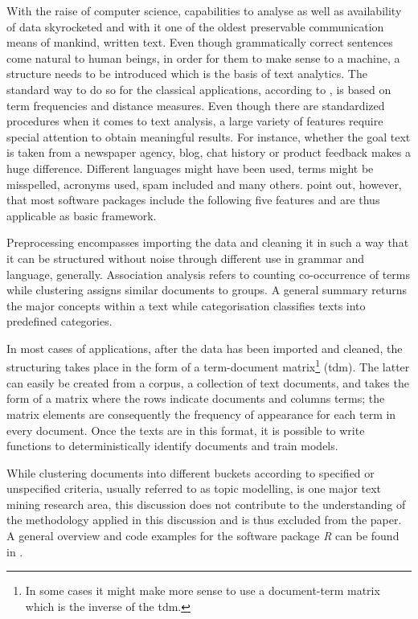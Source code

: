 With the raise of computer science, capabilities to analyse as well as availability of data skyrocketed and with it one of the oldest preservable communication means of mankind, written text. Even though grammatically correct sentences come natural to human beings, in order for them to make sense to a machine, a structure needs to be introduced which is the basis of text analytics. The standard way to do so for the classical applications, according to \textcite{Meyer.2008}, is based on term frequencies and distance measures. Even though there are standardized procedures when it comes to text analysis, a large variety of features require special attention to obtain meaningful results. For instance, whether the goal text is taken from a newspaper agency, blog, chat history or product feedback makes a huge difference. Different languages might have been used, terms might be misspelled, acronyms used, spam included and many others. \textcite{Meyer.2008} point out, however, that most software packages include the following five features and are thus applicable as basic framework. 

Preprocessing encompasses importing the data and cleaning it in such a way that it can be structured without noise through different use in grammar and language, generally. Association analysis refers to counting co-occurrence of terms while clustering assigns similar documents to groups. A general summary returns the major concepts within a text while categorisation classifies texts into predefined categories. 

In most cases of applications, after the data has been imported and cleaned, the structuring takes place in the form of a term-document matrix\footnote{In some cases it might make more sense to use a document-term matrix which is the inverse of the tdm.} (tdm). The latter can easily be created from a corpus, a collection of text documents, and takes the form of a matrix where the rows indicate documents and columns terms; the matrix elements are consequently the frequency of appearance for each term in every document. Once the texts are in this format, it is possible to write functions to deterministically identify documents and train models.

While clustering documents into different buckets according to specified or unspecified criteria, usually referred to as topic modelling, is one major text mining research area, this discussion does not contribute to the understanding of the methodology applied in this discussion and is thus excluded from the paper. A general overview and code examples for the software package \textit{R} can be found in \textcite[ch.~6]{Silge.2017}.

